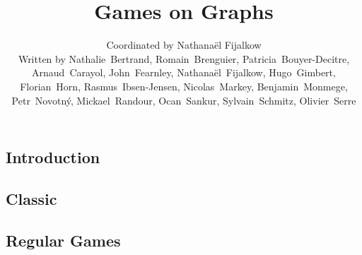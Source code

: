 \documentclass[graybox,envcountchap]{svmono}
\begin{document}


\author{Coordinated by Nathana{\"e}l Fijalkow\\[3\baselineskip]
    Written by Nathalie~Bertrand, Romain~Brenguier, Patricia~Bouyer-Decitre, Arnaud~Carayol, John~Fearnley, 
    Nathana{\"e}l~Fijalkow, Hugo~Gimbert, Florian~Horn, Rasmus~Ibsen-Jensen, Nicolas~Markey, Benjamin~Monmege, 
    Petr~Novotn{\'y}, Mickael~Randour, Ocan~Sankur, Sylvain~Schmitz, Olivier~Serre}
\title{Games on Graphs}
\maketitle

\frontmatter%

%
%
%
%

\setcounter{tocdepth}{1}
\tableofcontents

\mainmatter


\chapter{Introduction}
\label{1-chap:introduction}


\begin{partbacktext}
\part{Classic}
\label{part:classic}
\end{partbacktext}


\chapter{Regular Games}
\label{2-chap:regular}


\end{document}
